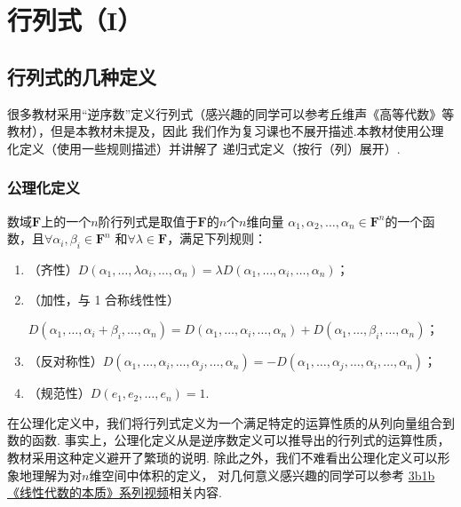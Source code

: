 \chapter{行列式（I）}

\section{行列式的几种定义}
很多教材采用``逆序数''定义行列式（感兴趣的同学可以参考丘维声《高等代数》等教材），但是本教材未提及，因此
我们作为复习课也不展开描述.本教材使用公理化定义（使用一些规则描述）并讲解了
递归式定义（按行（列）展开）.

\subsection{公理化定义}
\begin{definition} \label{def:11:公理化定义}
    数域$\mathbf{F}$上的一个$n$阶行列式是取值于$\mathbf{F}$的$n$个$n$维向量
    $\alpha_1,\alpha_2,\ldots,\alpha_n \in \mathbf{F}^n$的一个函数，且$\forall \alpha_i,\beta_i \in \mathbf{F}^n$
    和$\forall \lambda \in \mathbf{F}$，满足下列规则：
    \begin{enumerate}
        \item（齐性）$D(\alpha_1,\ldots,\lambda\alpha_i,\ldots,\alpha_n)=\lambda D(\alpha_1,\ldots,\alpha_i,\ldots,\alpha_n)$；

        \item（加性，与 1 合称线性性）

        $D(\alpha_1,\ldots,\alpha_i+\beta_i,\ldots,\alpha_n)=D(\alpha_1,\ldots,\alpha_i,\ldots,\alpha_n)+D(\alpha_1,\ldots,\beta_i,\ldots,\alpha_n)$；

        \item（反对称性）$D(\alpha_1,\ldots,\alpha_i,\ldots,\alpha_j,\ldots,\alpha_n)=-D(\alpha_1,\ldots,\alpha_j,\ldots,\alpha_i,\ldots,\alpha_n)$；

        \item（规范性）$D(e_1,e_2,\ldots,e_n)=1$.
    \end{enumerate}
\end{definition}
在公理化定义中，我们将行列式定义为一个满足特定的运算性质的从列向量组合到数的函数.
事实上，公理化定义从是逆序数定义可以推导出的行列式的运算性质，教材采用这种定义避开了繁琐的说明.
除此之外，我们不难看出公理化定义可以形象地理解为对$n$维空间中体积的定义，
对几何意义感兴趣的同学可以参考 \href{https://b23.tv/BV1ys411472E}{3b1b《线性代数的本质》系列视频}相关内容.
